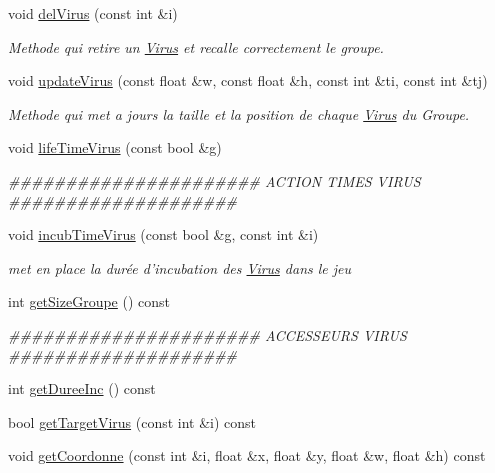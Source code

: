 \begin{DoxyCompactItemize}
void \hyperlink{classGroupeVirus_a55a336b22c6ce009761afda126419157}{delVirus} (const int \&i)
\begin{DoxyCompactList}\small\item\em Methode qui retire un \hyperlink{classVirus}{Virus} et recalle correctement le groupe. \end{DoxyCompactList}\item 
void \hyperlink{classGroupeVirus_ae9e18058850bb53e28b758dec0e94385}{updateVirus} (const float \&w, const float \&h, const int \&ti, const int \&tj)
\begin{DoxyCompactList}\small\item\em Methode qui met a jours la taille et la position de chaque \hyperlink{classVirus}{Virus} du Groupe. \end{DoxyCompactList}\item 
void \hyperlink{classGroupeVirus_a9d83eae2e696777ea63c429ff757aedb}{lifeTimeVirus} (const bool \&g)
\begin{DoxyCompactList}\small\item\em \#\#\#\#\#\#\#\#\#\#\#\#\#\#\#\#\#\#\#\#\#\# ACTION TIMES VIRUS \#\#\#\#\#\#\#\#\#\#\#\#\#\#\#\#\#\#\#\# \end{DoxyCompactList}\item 
void \hyperlink{classGroupeVirus_a638de9a7303c616b6b982821372e65ba}{incubTimeVirus} (const bool \&g, const int \&i)
\begin{DoxyCompactList}\small\item\em met en place la durée d'incubation des \hyperlink{classVirus}{Virus} dans le jeu \end{DoxyCompactList}\item 
int \hyperlink{classGroupeVirus_a0facffeec4faa527c99dd4a3e94c053b}{getSizeGroupe} () const 
\begin{DoxyCompactList}\small\item\em \#\#\#\#\#\#\#\#\#\#\#\#\#\#\#\#\#\#\#\#\#\# ACCESSEURS VIRUS \#\#\#\#\#\#\#\#\#\#\#\#\#\#\#\#\#\#\#\# \end{DoxyCompactList}\item 
int \hyperlink{classGroupeVirus_ae5f6d8f433fbc1c52afcd64242382b3f}{getDureeInc} () const 
\item 
bool \hyperlink{classGroupeVirus_ab292836d430ead8fb6380c581093b9a8}{getTargetVirus} (const int \&i) const 
\item 
void \hyperlink{classGroupeVirus_a0e5cf7c08b21992dc67d12ff822fa050}{getCoordonne} (const int \&i, float \&x, float \&y, float \&w, float \&h) const 
\item 

\end{DoxyCompactItemize}

